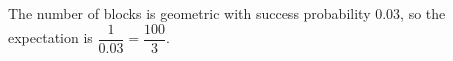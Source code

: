 The number of blocks is geometric with success probability $0.03$, so the expectation is $\dfrac1{0.03}=\boxed{\dfrac{100}3}$.
